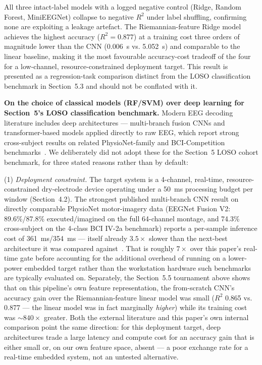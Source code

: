 \documentclass[11pt]{article}
\begin{document}
All three intact-label models with a logged negative control (Ridge, Random Forest, MiniEEGNet) collapse to negative $R^2$ under label shuffling, confirming none are exploiting a leakage artefact. The Riemannian-feature Ridge model achieves the highest accuracy ($R^2 = 0.877$) at a training cost three orders of magnitude lower than the CNN (0.006~s vs. 5.052~s) and comparable to the linear baseline, making it the most favourable accuracy-cost tradeoff of the four for a low-channel, resource-constrained deployment target. This result is presented as a regression-task comparison distinct from the LOSO classification benchmark in Section~5.3 and should not be conflated with it.

\textbf{On the choice of classical models (RF/SVM) over deep learning for Section~5's LOSO classification benchmark.} Modern EEG decoding literature includes deep architectures --- multi-branch fusion CNNs and transformer-based models applied directly to raw EEG, which report strong cross-subject results on related PhysioNet-family and BCI-Competition benchmarks~\cite{chowdhury2023,efficacy2022}. We deliberately did not adopt these for the Section~5 LOSO cohort benchmark, for three stated reasons rather than by default:

(1) \emph{Deployment constraint.} The target system is a 4-channel, real-time, resource-constrained dry-electrode device operating under a 50~ms processing budget per window (Section~4.2). The strongest published multi-branch CNN result on directly comparable PhysioNet motor-imagery data (EEGNet Fusion V2: 89.6\%/87.8\% executed/imagined on the full 64-channel montage, and 74.3\% cross-subject on the 4-class BCI IV-2a benchmark) reports a per-sample inference cost of 361~ms/354~ms --- itself already $3.5\times$ slower than the next-best architecture it was compared against~\cite{chowdhury2023}. That is roughly $7\times$ over this paper's real-time gate before accounting for the additional overhead of running on a lower-power embedded target rather than the workstation hardware such benchmarks are typically evaluated on. Separately, the Section~5.5 tournament above shows that on this pipeline's own feature representation, the from-scratch CNN's accuracy gain over the Riemannian-feature linear model was small ($R^2$ 0.865 vs. 0.877 --- the linear model was in fact marginally \emph{higher}) while its training cost was $\sim840\times$ greater. Both the external literature and this paper's own internal comparison point the same direction: for this deployment target, deep architectures trade a large latency and compute cost for an accuracy gain that is either small or, on our own feature space, absent --- a poor exchange rate for a real-time embedded system, not an untested alternative.
\end{document}

